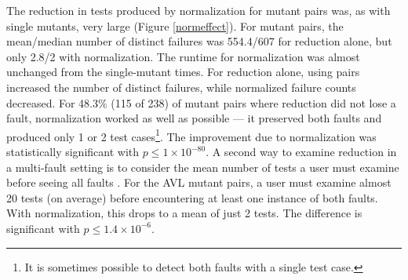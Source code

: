 {

The reduction in tests produced by normalization for mutant pairs
was, as with single mutants, very large (Figure \ref{normeffect}).
For mutant pairs, the mean/median number of distinct failures was
554.4/607 for reduction alone, but only 2.8/2 with
normalization.  The runtime for normalization was almost
unchanged from the single-mutant times.  For reduction
alone, using pairs increased the number of distinct failures, while
normalized failure counts decreased.  For 48.3\% (115 of 238) of
mutant pairs where reduction did not lose a fault, normalization
worked as well as possible --- it preserved both faults and produced only 1 or 2 test
cases\footnote{It is sometimes possible to detect both faults with a single test
  case.}.  The improvement due to normalization was
statistically significant with $p\leq1\times10^{-80}$.
A second way to examine reduction in a multi-fault setting is to
consider the mean number of tests a user must examine before seeing
all faults \cite{PLDI13}.  For the AVL mutant pairs, a user must
examine almost 20 tests (on average) before encountering at least
one instance of both faults.  With normalization, this  drops
to a mean of just 2 tests.  The difference is significant with $p\leq1.4\times10^{-6}$.

}
